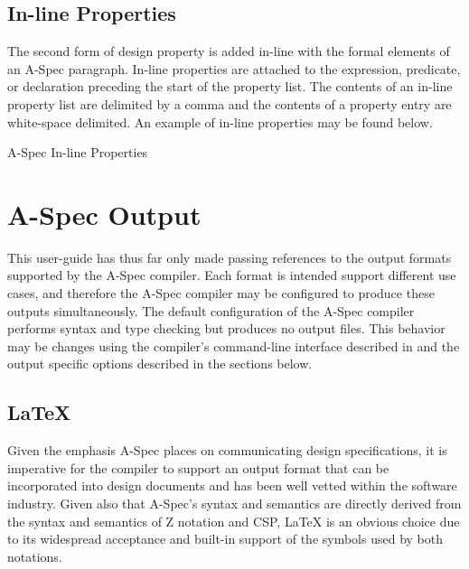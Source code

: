\documentclass[letterpaper,10pt,draft]{book}
\begin{document}
\section{In-line Properties}
   \label{sect:InProp}

The second form of design property is added in-line with the formal elements of
an A-Spec paragraph.  In-line properties are attached to the expression, predicate,
or declaration preceding the start of the property list.  The contents of an in-line
property list are delimited by a comma and the contents of a property entry are
white-space delimited.  An example of in-line properties may be found below.

\begin{example}
\begin{minipage}[t]{0.49\linewidth}
   
\end{minipage}
\begin{minipage}[t]{0.49\linewidth}
   \azsch
   
\end{minipage}

   \caption{A-Spec In-line Properties}
   \label{ex:InProp}
\end{example}

\chapter{A-Spec Output}
   \label{ch:Output}

This user-guide has thus far only made passing references to the output formats
supported by the A-Spec compiler.  Each format is intended support different use
cases, and therefore the A-Spec compiler may be configured to produce these outputs
simultaneously.  The default configuration of the A-Spec compiler performs syntax
and type checking but produces no output files.  This behavior may be changes using
the compiler's command-line interface described in  and the output
specific options described in the sections below.

\section{\LaTeX}
   \label{sect:Latex}

Given the emphasis A-Spec places on communicating design specifications, it is imperative
for the compiler to support an output format that can be incorporated into design
documents and has been well vetted within the software industry.  Given also that
A-Spec's syntax and semantics are directly derived from the syntax and semantics
of Z notation and CSP, \LaTeX{} is an obvious choice due to its widespread acceptance
and built-in support of the symbols used by both notations.
\end{document}
